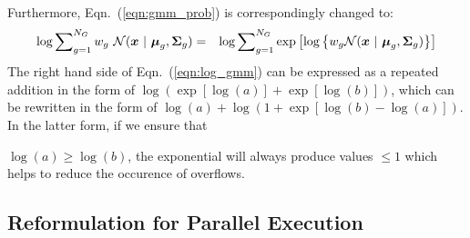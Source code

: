 Furthermore, Eqn.~(\ref{eqn:gmm_prob}) is correspondingly changed to:
%
\begin{eqnarray}
\log \sum\nolimits_{g=1}^{N_G} w_g ~ {{\mathcal{N}}}( {\boldsymbol{x}} ~|~ {\boldsymbol{\mu}}_g, {\boldsymbol{\Sigma}}_g )
& = &
\log \sum\nolimits_{g=1}^{N_G} \exp\left[ \log \left\{ w_g {{\mathcal{N}}}( {\boldsymbol{x}} ~|~ {\boldsymbol{\mu}}_g, {\boldsymbol{\Sigma}}_g ) \right\} \right]
\label{eqn:log_gmm}
\end{eqnarray}
The right hand side of Eqn.~(\ref{eqn:log_gmm}) can be expressed as a repeated addition in the form of \mbox{\small $\log(\exp\left[\log(a)\right] + \exp\left[\log(b)\right])$},
which can be rewritten in the form of \mbox{\small $\log(a) + \log\left( 1 + \exp\left[ \log(b) - \log(a) \right] \right)$}.
In the latter form, if we ensure that {\small $\log(a) \geq \log(b)$,
the exponential will always produce values $\leq 1$ which helps to reduce the occurence of overflows.



\subsection{Reformulation for Parallel Execution}


}
